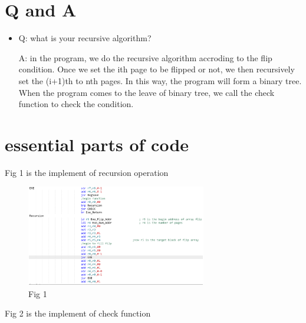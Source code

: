 \documentclass[twoside]{article}
\begin{document}
\begin{CJK*}{UTF8}{gbsn}
	\section{Q and A}
	\begin{itemize}
		\item 	Q: what is your recursive algorithm?
		
				A: in the program, we do the recursive algorithm accroding to the flip condition. Once we set the ith page to be flipped or not, we then recursively set the (i+1)th to nth pages. In this way, the program will form a binary tree. When the program comes to the leave of binary tree, we call the check function to check the condition.
	\end{itemize}


	\section{essential parts of code}
	Fig 1 is the implement of recursion operation
	\begin{figure}[htbp]
		\small
		\centering
		\includegraphics[width=0.7\textwidth]{2.eps}
		\caption{Fig 1} %
	\end{figure}
	
	
	Fig 2 is the implement of check function


\end{CJK*}
\end{document}
